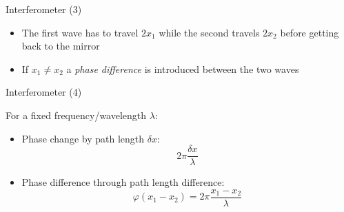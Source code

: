 \begin{frame}{Interferometer (3)}

    \begin{itemize}
        \item<1-> The first wave has to travel $2x_1$ while the second travels $2x_2$ before getting back to the mirror
        \item<2-> If $x_1 \neq x_2$ a \emph{phase difference} is introduced between the two waves

    \end{itemize}
    \begin{center}
        \scriptsize
        \def\svgwidth{0.5\textwidth}
        
    \end{center}


\end{frame}

\begin{frame}{Interferometer (4)}

    For a fixed frequency/wavelength $\lambda$:
    \vspace{0.4cm}
    \begin{itemize}
        \item Phase change by path length $\delta x$:
              \begin{equation}
                  2 \pi \frac{ \delta x}{\lambda}
              \end{equation}
        \item Phase difference through path length difference:
              \begin{equation}
                  \varphi(x_1-x_2) = 2 \pi   \frac{ x_1 - x_2 }{\lambda}
              \end{equation}

    \end{itemize}


\end{frame}


